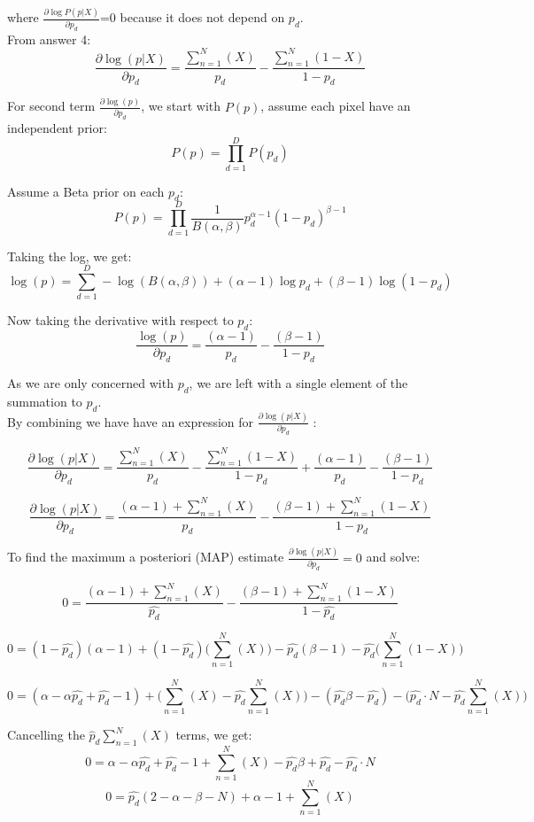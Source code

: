 \documentclass{article}
\begin{document}
where $\frac{\partial\log P(p | X)}{\partial p_d}$=0 because it does not depend on $p_d$.\\

From answer 4:
$$\frac{\partial \log ({p}|{X})}{\partial p_d} = \frac{\sum_{n=1}^{N} (X)}{p_d} -  \frac{\sum_{n=1}^{N} (1-X)}{1-p_d}$$

For second term $\frac{\partial \log({p})}{\partial p_d}$, we start with $P({p})$, assume each pixel have an independent prior:
$$P({p}) = \prod_{d=1}^D P(p_d)$$

Assume a Beta prior on each $p_d$:
$$P({p}) = \prod_{d=1}^D \frac{1}{B(\alpha, \beta)} p^{\alpha-1}_d (1-p_d)^{\beta-1}$$

Taking the log, we get:
$${\log}({p}) = \sum_{d=1}^{D} -\log (B(\alpha, \beta)) + (\alpha-1)\log p_d + (\beta-1)\log(1-p_d)$$

Now taking the derivative with respect to $p_d$:
$$\frac{\log ({p})}{\partial p_d} = \frac{(\alpha-1)}{p_d} -  \frac{(\beta-1)}{1-p_d}$$

As we are only concerned with $p_d$, we are left with a single element of the summation to $p_d$. \\

By combining we have have an expression for $\frac{\partial\log (p | X)}{\partial p_d}$ :

$$\frac{\partial\log (p | X)}{\partial p_d} = \frac{\sum_{n=1}^{N} (X)}{p_d} -  \frac{\sum_{n=1}^{N} (1-X)}{1-p_d} + \frac{(\alpha-1)}{p_d} -  \frac{(\beta-1)}{1-p_d}$$

$$\frac{\partial\log (p | X)}{\partial p_d} = \frac{(\alpha-1) + \sum_{n=1}^{N} (X)}{p_d} -  \frac{(\beta-1) + \sum_{n=1}^{N} (1-X)}{1-p_d}$$

To find the maximum a posteriori (MAP) estimate $\frac{\partial\log (p | X)}{\partial p_d} = 0$ and solve:

$$0 = \frac{(\alpha-1) + \sum_{n=1}^{N} (X)}{\hat{p_d}} -  \frac{(\beta-1) + \sum_{n=1}^{N} (1-X)}{1-\hat{p_d}}$$

$$0 = (1-\hat{p_d})(\alpha-1) + (1-\hat{p_d})\bigg(\sum_{n=1}^{N} (X)\bigg) -  \hat{p_d}(\beta-1) - \hat{p_d}\bigg(\sum_{n=1}^{N} (1-X)\bigg)$$

$$0 = (\alpha-\alpha \hat{p_d} + \hat{p_d} - 1) +\bigg(\sum_{n=1}^{N} (X) - \hat{p_d} \sum_{n=1}^{N} (X)\bigg) -  (\hat{p_d}\beta-\hat {p_d}) - \bigg(\hat{p_d}\cdot N - \hat{p_d}\sum_{n=1}^{N}(X)\bigg)$$

Cancelling the $\hat p_d\sum_{n=1}^{N} (X)$ terms, we get:
$$0 = \alpha-\alpha \hat{p_d} + \hat{p_d} - 1 +\sum_{n=1}^{N} (X) -  \hat{p_d}\beta+\hat{p_d} - \hat{p_d}\cdot N$$
$$0 = \hat{p_d}(2-\alpha-\beta-N) + \alpha - 1 +\sum_{n=1}^{N} (X)$$
\end{document}

